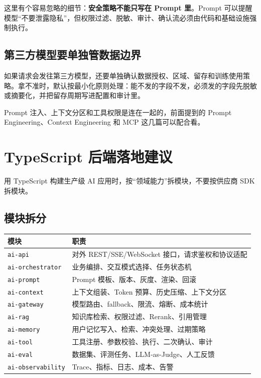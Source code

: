 \documentclass[9pt,a4paper,twocolumn]{ctexart}
\begin{document}
这里有个容易忽略的细节：\textbf{安全策略不能只写在 Prompt 里}。Prompt 可以提醒模型“不要泄露隐私”，但权限过滤、脱敏、审计、确认流必须由代码和基础设施强制执行。



\subsection*{第三方模型要单独管数据边界}


如果请求会发往第三方模型，还要单独确认数据授权、区域、留存和训练使用策略。拿不准时，默认按最小化原则处理：能不发的字段不发，必须发的字段先脱敏或摘要化，并把留存周期写进配置和审计里。



Prompt 注入、上下文分区和工具权限是连在一起的，前面提到的 Prompt Engineering、Context Engineering 和 MCP 这几篇可以配合看。



\section*{TypeScript 后端落地建议}


用 TypeScript 构建生产级 AI 应用时，按“领域能力”拆模块，不要按供应商 SDK 拆模块。



\subsection*{模块拆分}

{\footnotesize
\begin{tabular}{|p{}|p{}|}
\hline
\textbf{模块} & \textbf{职责} \\
\hline
\texttt{ai-api} & 对外 REST/SSE/WebSocket 接口，请求鉴权和协议适配 \\
\hline
\texttt{ai-orchestrator} & 业务编排、交互模式选择、任务状态机 \\
\hline
\texttt{ai-prompt} & Prompt 模板、版本、灰度、渲染、回滚 \\
\hline
\texttt{ai-context} & 上下文组装、Token 预算、历史压缩、上下文分区 \\
\hline
\texttt{ai-gateway} & 模型路由、fallback、限流、熔断、成本统计 \\
\hline
\texttt{ai-rag} & 知识库检索、权限过滤、Rerank、引用管理 \\
\hline
\texttt{ai-memory} & 用户记忆写入、检索、冲突处理、过期策略 \\
\hline
\texttt{ai-tool} & 工具注册、参数校验、执行、二次确认、审计 \\
\hline
\texttt{ai-eval} & 数据集、评测任务、LLM-as-Judge、人工反馈 \\
\hline
\texttt{ai-observability} & Trace、指标、日志、成本、告警 \\
\hline
\end{tabular}
}
\end{document}
